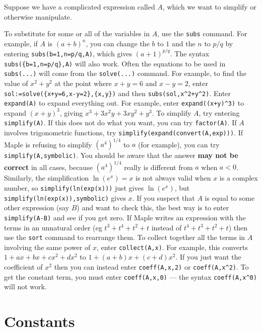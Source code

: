 \documentclass{amsart}
\begin{document}
Suppose we have a complicated expression called $A$, which we want to
simplify or otherwise manipulate. 
\begin{itemize}
  To substitute for some or all of the variables in
  $A$, use the \verb~subs~ command.  For example, if $A$ is
  $(a+b)^n$, you can change the $b$ to $1$ and the $n$ to
  $p/q$ by entering \verb~subs(b=1,n=p/q,A)~, which gives
  $(a+1)^{p/q}$.  The syntax \verb~subs({b=1,n=p/q},A)~
  will also work. 
%
  Often the equations to be used in \verb~subs(...)~ will
  come from the \verb~solve(...)~ command.  For example, to
  find the value of $x^2+y^2$ at the point where $x+y=6$ and
  $x-y=2$, enter \verb~sol:=solve({x+y=6,x-y=2},{x,y})~ and
  then \verb~subs(sol,x^2+y^2)~. 
%
  Enter \verb~expand(A)~ to expand everything out.  For
  example, enter \verb~expand((x+y)^3)~ to expand
  $(x+y)^3$, giving $x^3+3x^2y+3xy^2+y^3$. 
%
  To simplify $A$, try entering
  \verb~simplify(A)~.  If this 
  does not do what you want, you can try \verb~factor(A)~. 
  If $A$ involves trigonometric functions, try
  \verb~simplify(expand(convert(A,exp)))~. 
%
  If Maple is refusing to simplify $(a^4)^{1/4}$ to $a$ (for
  example), you can try \verb~simplify(A,symbolic)~.  You should be
  aware that the answer \textbf{may not be correct} in all cases,
  because $(a^4)^{1/4}$ really is different from $a$ when
  $a<0$.  Similarly, the simplification $\ln(e^x)=x$ is not
  always valid when $x$ is a complex number, so
  \verb~simplify(ln(exp(x)))~ just gives $\ln(e^x)$, but
  \verb~simplify(ln(exp(x)),symbolic)~ gives $x$. 
%
  If you suspect that $A$ is equal to some other expression (say
  $B$) and want to check this, the best way is to enter
  \verb~simplify(A-B)~ and see if you get zero. 
%
  If Maple writes an expression with the terms in an unnatural
  order (eg $t^3+t^4+t^2+t$ instead of $t^4+t^3+t^2+t$) then use the
  \verb~sort~ command to rearrange them. 
%
  To collect together all the terms in $A$ involving the same
  power of $x$, enter \verb~collect(A,x)~.  For example, this converts
  $1+ax+bx+cx^2+dx^2$ to $1+(a+b)x+(c+d)x^2$. 
%
  If you just want the
  coefficient of $x^2$ then you can instead enter \verb~coeff(A,x,2)~
  or \verb~coeff(A,x^2)~.  To get the constant term, you
  must enter \verb~coeff(A,x,0)~ --- the syntax
  \verb~coeff(A,x^0)~ will not work. 
\end{itemize}

\section{Constants}
\setcounter{notecounter}{0}
\end{document}

